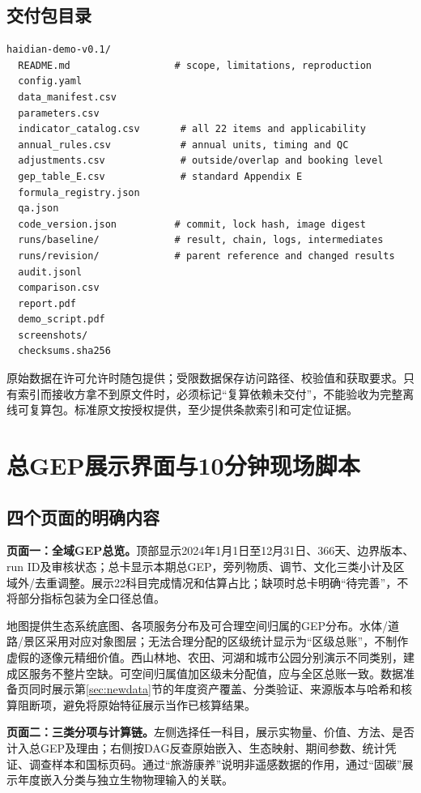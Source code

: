 \documentclass[12pt,a4paper,fontset=fandol]{ctexart}
\begin{document}
\subsection{交付包目录}
\begin{lstlisting}
haidian-demo-v0.1/
  README.md                  # scope, limitations, reproduction
  config.yaml
  data_manifest.csv
  parameters.csv
  indicator_catalog.csv       # all 22 items and applicability
  annual_rules.csv            # annual units, timing and QC
  adjustments.csv             # outside/overlap and booking level
  gep_table_E.csv             # standard Appendix E
  formula_registry.json
  qa.json
  code_version.json          # commit, lock hash, image digest
  runs/baseline/             # result, chain, logs, intermediates
  runs/revision/             # parent reference and changed results
  audit.jsonl
  comparison.csv
  report.pdf
  demo_script.pdf
  screenshots/
  checksums.sha256
\end{lstlisting}
原始数据在许可允许时随包提供；受限数据保存访问路径、校验值和获取要求。只有索引而接收方拿不到原文件时，必须标记“复算依赖未交付”，不能验收为完整离线可复算包。标准原文按授权提供，至少提供条款索引和可定位证据。

\section{总GEP展示界面与10分钟现场脚本}\label{sec:demo}
\subsection{四个页面的明确内容}
\textbf{页面一：全域GEP总览。}顶部显示2024年1月1日至12月31日、366天、边界版本、run ID及审核状态；总卡显示本期总GEP，旁列物质、调节、文化三类小计及区域外/去重调整。展示22科目完成情况和估算占比；缺项时总卡明确“待完善”，不将部分指标包装为全口径总值。

地图提供生态系统底图、各项服务分布及可合理空间归属的GEP分布。水体/道路/景区采用对应对象图层；无法合理分配的区级统计显示为“区级总账”，不制作虚假的逐像元精细价值。西山林地、农田、河湖和城市公园分别演示不同类别，建成区服务不整片空缺。可空间归属值加区级未分配值，应与全区总账一致。数据准备页同时展示第\ref{sec:newdata}节的年度资产覆盖、分类验证、来源版本与哈希和核算阻断项，避免将原始特征展示当作已核算结果。

\textbf{页面二：三类分项与计算链。}左侧选择任一科目，展示实物量、价值、方法、是否计入总GEP及理由；右侧按DAG反查原始嵌入、生态映射、期间参数、统计凭证、调查样本和国标页码。通过“旅游康养”说明非遥感数据的作用，通过“固碳”展示年度嵌入分类与独立生物物理输入的关联。
\end{document}
